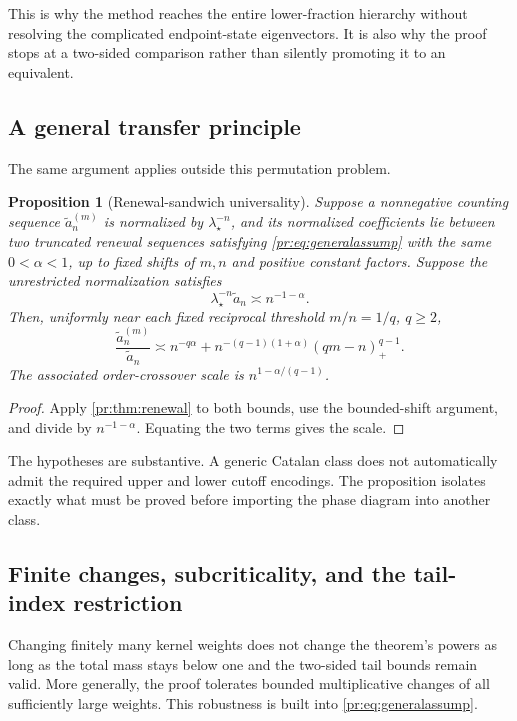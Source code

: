 \documentclass[11pt,a4paper]{article}
\newtheorem{proposition}[proposition]{Proposition}
\theoremstyle{definition}\newaliascnt{definition}{theorem}
\theoremstyle{remark}\newaliascnt{remark}{theorem}
\newcommand{\prpos}[1]{(#1)_+}
\begin{document}
This is why the method reaches the entire lower-fraction hierarchy without
resolving the complicated endpoint-state eigenvectors. It is also why the
proof stops at a two-sided comparison rather than silently promoting it to
an equivalent.

\subsection{A general transfer principle}
The same argument applies outside this permutation problem.

\begin{proposition}[Renewal-sandwich universality]\label{pr:prop:universality}
Suppose a nonnegative counting sequence $\tilde a_n^{(m)}$ is normalized by
$\lambda_\star^{-n}$, and its normalized coefficients lie between two
truncated renewal sequences satisfying \eqref{pr:eq:generalassump} with the
same $0<\alpha<1$, up to fixed shifts of $m,n$ and positive constant factors.
Suppose the unrestricted normalization satisfies
\[
 \lambda_\star^{-n}\tilde a_n\asymp n^{-1-\alpha}.
\]
Then, uniformly near each fixed reciprocal threshold $m/n=1/q$, $q\ge2$,
\begin{equation}
 \frac{\tilde a_n^{(m)}}{\tilde a_n}\asymp
 n^{-q\alpha}
 +n^{-(q-1)(1+\alpha)}\prpos{qm-n}^{q-1}.
 \label{pr:eq:universalprob}
\end{equation}
The associated order-crossover scale is $n^{1-\alpha/(q-1)}$.
\end{proposition}
\begin{proof}
Apply \cref{pr:thm:renewal} to both bounds, use the bounded-shift argument,
and divide by $n^{-1-\alpha}$. Equating the two terms gives the scale.
\end{proof}

The hypotheses are substantive. A generic Catalan class does not
automatically admit the required upper and lower cutoff encodings. The
proposition isolates exactly what must be proved before importing the phase
diagram into another class.

\subsection{Finite changes, subcriticality, and the tail-index restriction}
Changing finitely many kernel weights does not change the theorem's powers
as long as the total mass stays below one and the two-sided tail bounds
remain valid. More generally, the proof tolerates bounded multiplicative
changes of all sufficiently large weights. This robustness is built into
\eqref{pr:eq:generalassump}.
\end{document}
